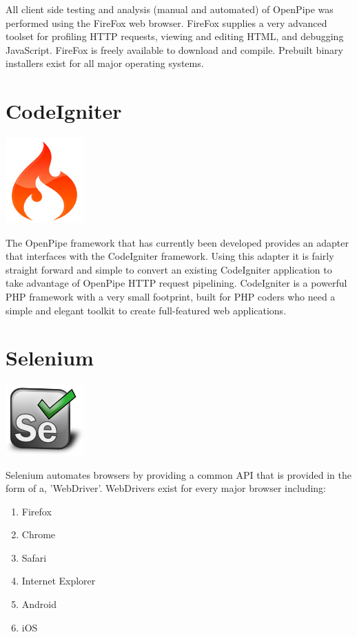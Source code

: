 \documentclass[12pt]{report}
\begin{document}
All client side testing and analysis (manual and automated) of OpenPipe was performed using the FireFox web browser. FireFox supplies a very advanced toolset for profiling HTTP requests, viewing and editing HTML, and debugging JavaScript. FireFox is freely available to download and compile. Prebuilt binary installers exist for all major operating systems. 
 

\section{CodeIgniter}
\begin{center}
\includegraphics[width=30mm]{figures/images/ci_logo.jpg}
\end{center}

The OpenPipe framework that has currently been developed provides an adapter that interfaces with the CodeIgniter framework. Using this adapter it is fairly straight forward and simple to convert an existing CodeIgniter application to take advantage of OpenPipe HTTP request pipelining. CodeIgniter is a powerful PHP framework with a very small footprint, built for PHP coders who need a simple and elegant toolkit to create full-featured web applications. 

\section{Selenium}
\begin{center}
\includegraphics[width=30mm]{figures/images/selenium_logo.png}
\end{center}

Selenium automates browsers by providing a common API that is provided in the form of a, 'WebDriver'. WebDrivers exist for every major browser including:

\begin{enumerate}
\item Firefox
\item Chrome
\item Safari
\item Internet Explorer
\item Android
\item iOS
\end{enumerate}
\end{document}
